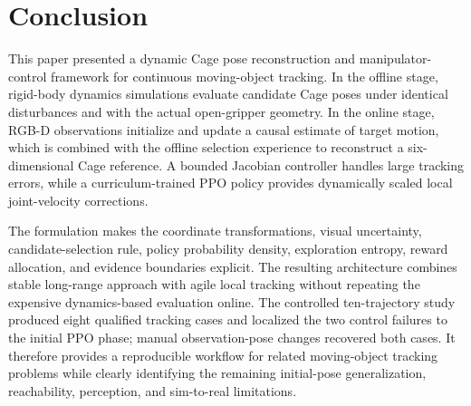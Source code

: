 \documentclass[conference]{IEEEtran}
\begin{document}
\section{Conclusion}

This paper presented a dynamic Cage pose reconstruction and manipulator-control framework for continuous moving-object tracking. In the offline stage, rigid-body dynamics simulations evaluate candidate Cage poses under identical disturbances and with the actual open-gripper geometry. In the online stage, RGB-D observations initialize and update a causal estimate of target motion, which is combined with the offline selection experience to reconstruct a six-dimensional Cage reference. A bounded Jacobian controller handles large tracking errors, while a curriculum-trained PPO policy provides dynamically scaled local joint-velocity corrections.

The formulation makes the coordinate transformations, visual uncertainty, candidate-selection rule, policy probability density, exploration entropy, reward allocation, and evidence boundaries explicit. The resulting architecture combines stable long-range approach with agile local tracking without repeating the expensive dynamics-based evaluation online. The controlled ten-trajectory study produced eight qualified tracking cases and localized the two control failures to the initial PPO phase; manual observation-pose changes recovered both cases. It therefore provides a reproducible workflow for related moving-object tracking problems while clearly identifying the remaining initial-pose generalization, reachability, perception, and sim-to-real limitations.
\end{document}
